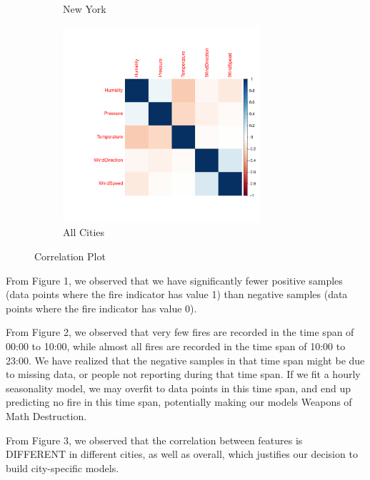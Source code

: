 \documentclass[10pt]{article}
\begin{document}
\begin{figure}[H]
\begin{subfigure}[t]{0.3\textwidth}
        \caption{New York}
    \end{subfigure}
    \begin{subfigure}[t]{0.3\textwidth}
        \centering
        \includegraphics[width=0.8\textwidth]{../plot/corr_all.pdf}
        \caption{All Cities}
    \end{subfigure}
    \caption{Correlation Plot}
\end{figure}

\newpage

From Figure 1, we observed that we have
significantly fewer positive samples (data points where the fire indicator
has value 1) than negative samples (data points where the fire indicator
has value 0).\par

From Figure 2, we observed that very few fires are recorded in the time
span of 00:00 to 10:00, while almost all fires are recorded in the time
span of 10:00 to 23:00. We have realized that the negative samples in that
time span might be due to missing data, or people not reporting during
that time span. If we fit a hourly seasonality model, we may overfit
to data points in this time span, and end up
predicting no fire in this time span, potentially making our models
Weapons of Math Destruction.\par

From Figure 3, we observed that the correlation between features is
DIFFERENT in different cities, as well as overall, which justifies
our decision to build city-specific models.\par
\end{document}
